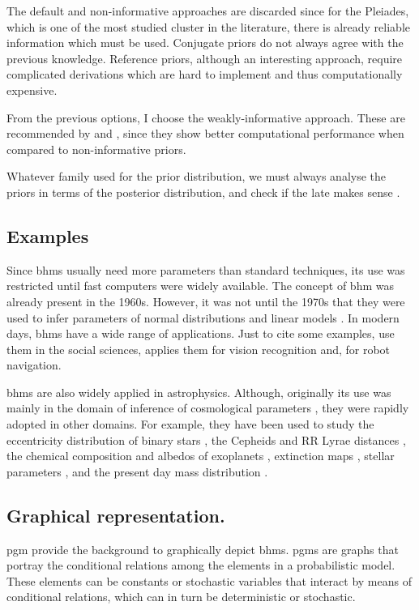 The default and non-informative approaches are discarded since for the Pleiades, which is one of the most studied cluster in the literature, there is already reliable information which must be used.  Conjugate priors do not always agree with the previous knowledge. Reference priors, although an interesting approach, require complicated derivations which are hard to implement and thus computationally expensive. 

From the previous options, I choose the weakly-informative approach. These are recommended by \citet{Gelman2006,Gelman2008,Huang2013} and \citet{Chung2015}, since they show better computational performance when compared to non-informative priors.

Whatever family used for the prior distribution, we must always analyse the priors in terms of the posterior distribution, and check if the late makes sense \cite[][ Chap. 6]{Gelman2006,Gelman2013}.


\subsection{Examples}
Since \glspl{bhm}  usually need more parameters than standard techniques, its use was restricted until fast computers were widely available. The concept of \gls{bhm}  was already present in the 1960s. However, it was not until  the 1970s that they were used to infer parameters of normal distributions and linear models \cite[see][for an historical perspective of \glspl{bhm} ]{Good1980}. In modern days, \glspl{bhm}  have a wide range of applications. Just to cite some examples, \citet{Gelman2007} use them in the social sciences, \citet{Fei2005} applies them for vision recognition and, \citet{Diard2008} for robot navigation.

\glspl{bhm} are also widely applied in astrophysics. Although, originally its use was mainly in the domain of inference of cosmological parameters \cite[see for example the works of][]{Feeney2013,March2014,Anderes2015,Shariff2016,Alsing2017}, they were rapidly adopted in other domains. For example, they have been used to study the eccentricity distribution of binary stars \citet{Hogg2010}, the Cepheids \citep{Barnes2004} and RR Lyrae distances \citep{Jefferys2007}, the chemical composition \citep{Wolfgang2015} and albedos of exoplanets \citep{Demory2014}, extinction maps \citep{Sale2012}, stellar parameters \citep{Shkedy2007}, and the present day mass distribution \citep{Tapiador2017}.

\subsection{Graphical representation.}
\label{sect:PGM}
\gls{pgm} provide the background to graphically depict \glspl{bhm}. \glspl{pgm} are graphs that portray the conditional relations among the elements in a probabilistic model. These elements can be constants or stochastic variables that interact by means of conditional relations, which can in turn be deterministic or stochastic. 

